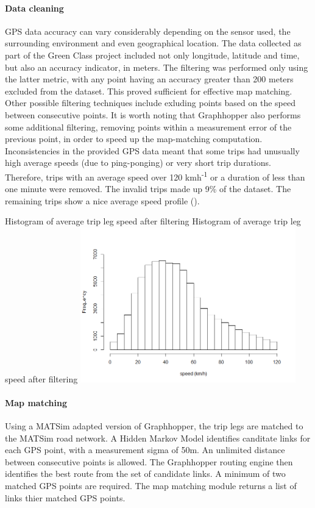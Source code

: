 \paragraph{Data cleaning}
GPS data accuracy can vary considerably depending on the sensor used, the surrounding environment and even geographical location.
The data collected as part of the Green Class project included not only longitude, latitude and time, but also an accuracy indicator, in meters.
The filtering was performed only using the latter metric, with any point having an accuracy greater than 200 meters excluded from the dataset.
This proved sufficient for effective map matching.
Other possible filtering techniques include exluding points based on the speed between consecutive points.
It is worth noting that Graphhopper also performs some additional filtering, removing points within a measurement error of the previous point, in order to speed up the map-matching computation.
Inconsistencies in the provided GPS data meant that some trips had unusually high average speeds (due to ping-ponging) or very short trip durations.
Therefore, trips with an average speed over 120 kmh\textsuperscript{-1} or a duration of less than one minute were removed.
The invalid trips made up 9\% of the dataset.
The remaining trips show a nice average speed profile ().

\createfigure%
	{Histogram of average trip leg speed after filtering}
	{Histogram of average trip leg speed after filtering}
    {\label{fig:avg_speeds}}
    {\includegraphics[width=0.7\textwidth]{figures/avg_speed_green_class_matched}}
	{}

\paragraph{Map matching}

Using a MATSim adapted version of Graphhopper, the trip legs are matched to the MATSim road network. A Hidden Markov Model \citep{newson2009hidden} identifies canditate links for each GPS point, with a measurement sigma of 50m. An unlimited distance between consecutive points is allowed. The Graphhopper routing engine then identifies the best route from the set of candidate links. A minimum of two matched GPS points are required. The map matching module returns a list of links thier matched GPS points.

